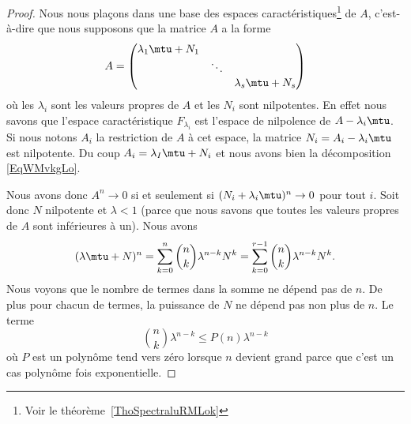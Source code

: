 \begin{proof}
	Nous nous plaçons dans une base des espaces caractéristiques\footnote{Voir le théorème~\ref{ThoSpectraluRMLok}} de \( A\), c'est-à-dire que nous supposons que la matrice \( A\) a la forme
	\begin{equation}        \label{EqWMvkgLo}
		A=\begin{pmatrix}
			\lambda_1\mtu+N_1 &        &                   \\
			                  & \ddots &                   \\
			                  &        & \lambda_s\mtu+N_s
		\end{pmatrix}
	\end{equation}
	où les \( \lambda_i\) sont les valeurs propres de \( A\) et les \( N_i\) sont nilpotentes. En effet nous savons que l'espace caractéristique \( F_{\lambda_i}\) est l'espace de nilpolence de \( A-\lambda_i\mtu\). Si nous notons \( A_i\) la restriction de \( A\) à cet espace, la matrice \( N_i=A_i-\lambda_i\mtu\) est nilpotente. Du coup \( A_i=\lambda_I\mtu+N_i\) et nous avons bien la décomposition \eqref{EqWMvkgLo}.

	Nous avons donc \( A^n\to 0\) si et seulement si \( (N_i+\lambda_i\mtu)^n\to 0\) pour tout \( i\). Soit donc \( N\) nilpotente et \( \lambda<1\) (parce que nous savons que toutes les valeurs propres de \( A\) sont inférieures à un). Nous avons
	\begin{equation}
		(\lambda\mtu+N)^n=\sum_{k=0}^n\binom{ n }{ k }\lambda^{n-k}N^{k}
		=\sum_{k=0}^{r-1}\binom{ n }{ k }\lambda^{n-k}N^{k}.
	\end{equation}
	Nous voyons que le nombre de termes dans la somme ne dépend pas de \( n\). De plus pour chacun de termes, la puissance de \( N\) ne dépend pas non plus de \( n\). Le terme
	\begin{equation}
		\binom{ n }{ k }\lambda^{n-k}\leq P(n)\lambda^{n-k}
	\end{equation}
	où \( P\) est un polynôme tend vers zéro lorsque \( n\) devient grand parce que c'est un cas polynôme fois exponentielle.
\end{proof}


